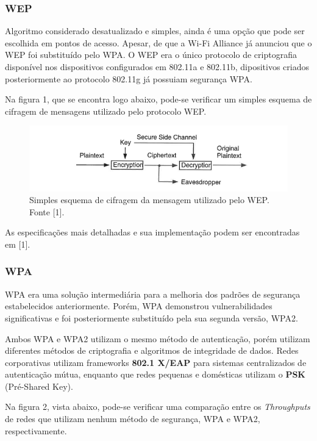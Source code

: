 \documentclass[journal]{IEEEtran}
\begin{document}
\subsubsection{WEP}
Algoritmo considerado desatualizado e simples, ainda é uma opção que pode ser escolhida em pontos de acesso. Apesar, de que a Wi-Fi Alliance já anunciou que o WEP foi substituído pelo WPA. O WEP era o único protocolo de criptografia disponível nos dispositivos configurados em 802.11a e 802.11b, dipositivos criados posteriormente ao protocolo 802.11g já possuiam segurança WPA. \par
Na figura 1, que se encontra logo abaixo, pode-se verificar um simples esquema de cifragem de mensagens utilizado pelo protocolo WEP. \par

\begin{figure}[h!]
	\includegraphics[width=\linewidth]{../pictures/simple_WEP_schema.PNG}
	\caption{Simples esquema de cifragem da mensagem utilizado pelo WEP. Fonte [1].}
	\label{fig:wep_schema}
\end{figure}

As especificações mais detalhadas e sua implementação podem ser encontradas em [1].

\subsubsection{WPA}
WPA era uma solução intermediária para a melhoria dos padrões de segurança estabelecidos anteriormente. Porém, WPA demonstrou vulnerabilidades significativas e foi posteriormente substituído pela sua segunda versão, WPA2. \par
Ambos WPA e WPA2 utilizam o mesmo método de autenticação, porém utilizam diferentes métodos de criptografia e algoritmos de integridade de dados. Redes corporativas utilizam frameworks \textbf{802.1 X/EAP} para sistemas centralizados de autenticação mútua, enquanto que redes pequenas e domésticas utilizam o \textbf{PSK} (Pré-Shared Key).\par
Na figura 2, vista abaixo, pode-se verificar uma comparação entre os \textit{Throughputs} de redes que utilizam nenhum método de segurança, WPA e WPA2, respectivamente. \par
\end{document}
